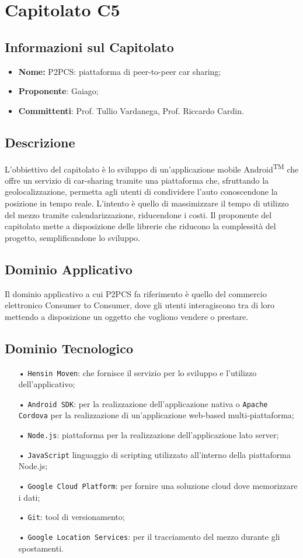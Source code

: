 \section{Capitolato C5}
\subsection{Informazioni sul Capitolato}
\begin{itemize}
	\item \textbf{Nome:} P2PCS: piattaforma di peer-to-peer car sharing;
	\item \textbf{Proponente}: Gaiago;
	\item \textbf{Committenti}: Prof. Tullio Vardanega, Prof. Riccardo Cardin.
\end{itemize}
\subsection{Descrizione}
L'obbiettivo del capitolato è lo sviluppo di un'applicazione mobile Android\textsuperscript{TM} che offre un servizio di 
car-sharing tramite una piattaforma che, sfruttando la geolocalizzazione, permetta agli utenti di condividere l'auto conoscendone la posizione in tempo reale. 
L'intento è quello di massimizzare il tempo di utilizzo del mezzo tramite calendarizzazione, 
riducendone i costi. 
Il proponente del capitolato mette a disposizione delle librerie che riducono la 
complessità del progetto, semplificandone lo sviluppo.

\subsection{Dominio Applicativo}
Il dominio applicativo a cui P2PCS fa riferimento è quello del commercio elettronico Consumer to Consumer, dove gli utenti interagiscono tra di loro mettendo a disposizione un oggetto che vogliono vendere o prestare.

\subsection{Dominio Tecnologico}
\begin{itemize}
\item[•] \texttt{Hensin Moven}: che fornisce il servizio per lo sviluppo e l'utilizzo dell'applicativo;
\item[•] \texttt{Android SDK}: per la realizzazione dell'applicazione nativa o \texttt{Apache Cordova} per
 la realizzazione di un'applicazione web-based multi-piattaforma;
\item[•] \texttt{Node.js}: piattaforma per la realizzazione dell'applicazione lato server;
\item[•] \texttt{JavaScript} linguaggio di scripting utilizzato all'interno della piattaforma Node.js;
\item[•] \texttt{Google Cloud Platform}: per fornire una soluzione cloud dove memorizzare i dati;
\item[•] \texttt{Git}: tool di versionamento;
\item[•] \texttt{Google Location Services}: per il tracciamento del mezzo durante gli spostamenti.
\end{itemize}

